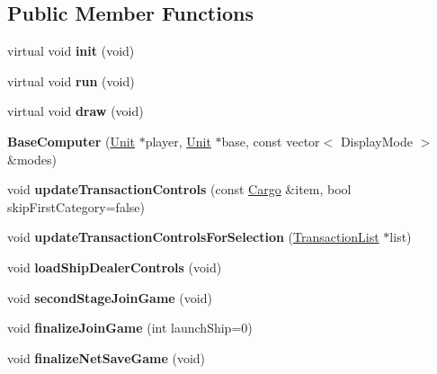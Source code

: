 \subsection*{Public Member Functions}
\begin{DoxyCompactItemize}
\item 
virtual void {\bfseries init} (void)\hypertarget{classBaseComputer_a81278559755088477f77daf01017520c}{}\label{classBaseComputer_a81278559755088477f77daf01017520c}

\item 
virtual void {\bfseries run} (void)\hypertarget{classBaseComputer_ae63bce240508339475df4bb1e6753c43}{}\label{classBaseComputer_ae63bce240508339475df4bb1e6753c43}

\item 
virtual void {\bfseries draw} (void)\hypertarget{classBaseComputer_aa754d56026e404463303ec3b77d06322}{}\label{classBaseComputer_aa754d56026e404463303ec3b77d06322}

\item 
{\bfseries Base\+Computer} (\hyperlink{classUnit}{Unit} $\ast$player, \hyperlink{classUnit}{Unit} $\ast$base, const vector$<$ Display\+Mode $>$ \&modes)\hypertarget{classBaseComputer_ad2ecf0f07ac5f7cbaa4f0cbd12c46304}{}\label{classBaseComputer_ad2ecf0f07ac5f7cbaa4f0cbd12c46304}

\item 
void {\bfseries update\+Transaction\+Controls} (const \hyperlink{classCargo}{Cargo} \&item, bool skip\+First\+Category=false)\hypertarget{classBaseComputer_a2cbe05f8a30b96bf0407556634a44d38}{}\label{classBaseComputer_a2cbe05f8a30b96bf0407556634a44d38}

\item 
void {\bfseries update\+Transaction\+Controls\+For\+Selection} (\hyperlink{structBaseComputer_1_1TransactionList}{Transaction\+List} $\ast$list)\hypertarget{classBaseComputer_aacc46a9d7455d7ad84e2305f92fcb53f}{}\label{classBaseComputer_aacc46a9d7455d7ad84e2305f92fcb53f}

\item 
void {\bfseries load\+Ship\+Dealer\+Controls} (void)\hypertarget{classBaseComputer_a3c3b6f2df5c294a133e401056151e04a}{}\label{classBaseComputer_a3c3b6f2df5c294a133e401056151e04a}

\item 
void {\bfseries second\+Stage\+Join\+Game} (void)\hypertarget{classBaseComputer_a7f43594474c0b4e4ffdfabdbd0200449}{}\label{classBaseComputer_a7f43594474c0b4e4ffdfabdbd0200449}

\item 
void {\bfseries finalize\+Join\+Game} (int launch\+Ship=0)\hypertarget{classBaseComputer_a190d7a201b1ad64405fcfebe6a1c93a7}{}\label{classBaseComputer_a190d7a201b1ad64405fcfebe6a1c93a7}

\item 
void {\bfseries finalize\+Net\+Save\+Game} (void)\hypertarget{classBaseComputer_a4617f47f675531c706097e87b2085b53}{}\label{classBaseComputer_a4617f47f675531c706097e87b2085b53}

\end{DoxyCompactItemize}
